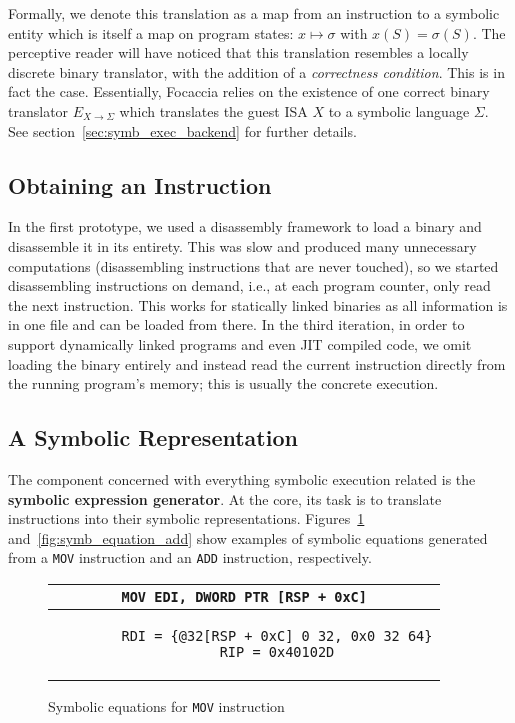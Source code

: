 Formally, we denote this translation as a map from an instruction to a symbolic entity which is itself a map on program
states: $x \mapsto \sigma$ with $x(S) = \sigma(S)$. The perceptive reader will have noticed that this translation
resembles a locally discrete binary translator, with the addition of a \textit{correctness condition}. This is in fact
the case. Essentially, Focaccia relies on the existence of one correct binary translator $E_{X \rightarrow \Sigma}$ which
translates the guest \ac{ISA} $X$ to a symbolic language $\Sigma$. See section~\ref{sec:symb_exec_backend} for
further details.

\subsection{Obtaining an Instruction}

In the first prototype, we used a disassembly framework to load a binary and disassemble it in its entirety. This was
slow and produced many unnecessary computations (disassembling instructions that are never touched), so we started
disassembling instructions on demand, i.e., at each program counter, only read the next instruction. This works for
statically linked binaries as all information is in one file and can be loaded from there. In the third iteration, in
order to support dynamically linked programs and even \ac{JIT} compiled code, we omit loading the binary entirely and
instead read the current instruction directly from the running program's memory; this is usually the concrete execution.

\subsection{A Symbolic Representation}

The component concerned with everything symbolic execution related is the \textbf{symbolic expression generator}. At the
core, its task is to translate instructions into their symbolic representations. Figures~\ref{fig:symb_equation_mov}
and~\ref{fig:symb_equation_add} show examples of symbolic equations generated from a \texttt{MOV} instruction and an
\texttt{ADD} instruction, respectively.

\begin{figure}[htbp]
    \centering
    \begin{tabular}{c}
    \texttt{MOV        EDI, DWORD PTR [RSP + 0xC]} \\
    \midrule
    \begin{lstlisting}
        RDI = {@32[RSP + 0xC] 0 32, 0x0 32 64}
        RIP = 0x40102D
    \end{lstlisting}
    \end{tabular}
    \caption{Symbolic equations for \texttt{MOV} instruction}\label{fig:symb_equation_mov}
\end{figure}

